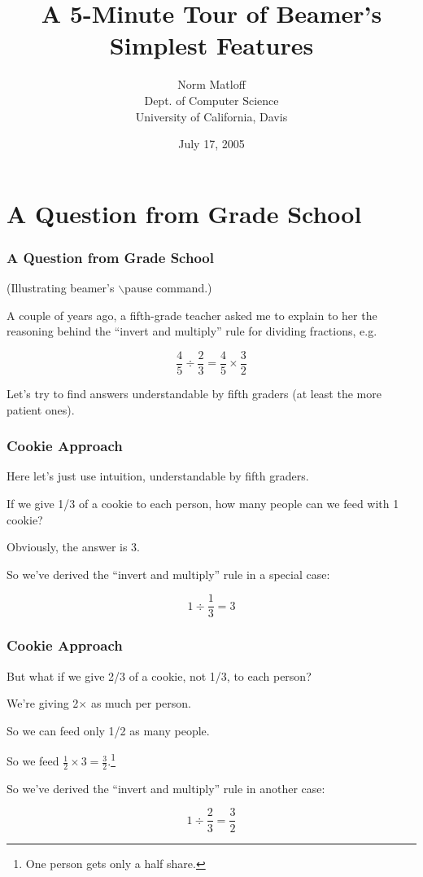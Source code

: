 \documentclass{beamer}
\title{A 5-Minute Tour of Beamer's Simplest Features}
\author{Norm Matloff \\
    Dept. of Computer Science \\
    University of California, Davis
}
\date{July 17, 2005}
\begin{document}

\section{A Question from Grade School}

\begin{frame}
\frametitle{A Question from Grade School}

(Illustrating {\sc beamer}'s $\backslash$pause command.)
\vskip 0.5in

A couple of years ago, a fifth-grade teacher asked me to explain to her
the reasoning behind the ``invert and multiply'' rule for dividing
fractions, e.g.
\pause  %

$$
\frac{4}{5} \div \frac{2}{3} = \frac{4}{5} \times \frac{3}{2}
$$

\pause

Let's try to find answers understandable by fifth graders (at least the
more patient ones).

\end{frame}

\begin{frame}
\frametitle{Cookie Approach}

Here let's just use intuition, understandable by fifth graders.

\pause

If we give 1/3 of a cookie to each person, how many people can we
feed with 1 cookie?

\pause

Obviously, the answer is 3.

So we've derived the ``invert and multiply'' rule in a special case:

$$
1 \div \frac{1}{3} = 3
$$

\end{frame}

\begin{frame}
\frametitle{Cookie Approach}

But what if we give 2/3 of a cookie, not 1/3, to each person?

We're giving 2$\times$ as much per person.

So we can feed only 1/2 as many people.

So we feed  $  = $.\footnote{One person
gets only a half share.}

So we've derived the ``invert and multiply'' rule in another case:

$$
1 \div \frac{2}{3} = \frac{3}{2}
$$

\end{frame}
\end{document}
